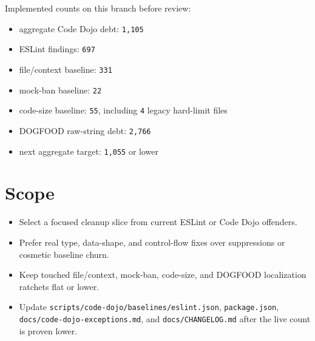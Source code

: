 Implemented counts on this branch before review:

\begin{itemize}
\tightlist
\item
  aggregate Code Dojo debt: \texttt{1\allowbreak{},\allowbreak{}1\allowbreak{}0\allowbreak{}5}
\item
  ESLint findings: \texttt{6\allowbreak{}9\allowbreak{}7}
\item
  file/context baseline: \texttt{3\allowbreak{}3\allowbreak{}1}
\item
  mock-ban baseline: \texttt{2\allowbreak{}2}
\item
  code-size baseline: \texttt{5\allowbreak{}5}, including \texttt{4} legacy hard-limit files
\item
  DOGFOOD raw-string debt: \texttt{2\allowbreak{},\allowbreak{}7\allowbreak{}6\allowbreak{}6}
\item
  next aggregate target: \texttt{1\allowbreak{},\allowbreak{}0\allowbreak{}5\allowbreak{}5} or lower
\end{itemize}

\section{Scope}\label{record-233-scope}

\begin{itemize}
\tightlist
\item
  Select a focused cleanup slice from current ESLint or Code Dojo offenders.
\item
  Prefer real type, data-shape, and control-flow fixes over suppressions or cosmetic baseline churn.
\item
  Keep touched file/context, mock-ban, code-size, and DOGFOOD localization ratchets flat or lower.
\item
  Update \texttt{s\allowbreak{}c\allowbreak{}r\allowbreak{}i\allowbreak{}p\allowbreak{}t\allowbreak{}s\allowbreak{}/\allowbreak{}c\allowbreak{}o\allowbreak{}d\allowbreak{}e\allowbreak{}-\allowbreak{}d\allowbreak{}o\allowbreak{}j\allowbreak{}o\allowbreak{}/\allowbreak{}b\allowbreak{}a\allowbreak{}s\allowbreak{}e\allowbreak{}l\allowbreak{}i\allowbreak{}n\allowbreak{}e\allowbreak{}s\allowbreak{}/\allowbreak{}e\allowbreak{}s\allowbreak{}l\allowbreak{}i\allowbreak{}n\allowbreak{}t\allowbreak{}.\allowbreak{}j\allowbreak{}s\allowbreak{}o\allowbreak{}n}, \texttt{p\allowbreak{}a\allowbreak{}c\allowbreak{}k\allowbreak{}a\allowbreak{}g\allowbreak{}e\allowbreak{}.\allowbreak{}j\allowbreak{}s\allowbreak{}o\allowbreak{}n}, \texttt{d\allowbreak{}o\allowbreak{}c\allowbreak{}s\allowbreak{}/\allowbreak{}c\allowbreak{}o\allowbreak{}d\allowbreak{}e\allowbreak{}-\allowbreak{}d\allowbreak{}o\allowbreak{}j\allowbreak{}o\allowbreak{}-\allowbreak{}e\allowbreak{}x\allowbreak{}c\allowbreak{}e\allowbreak{}p\allowbreak{}t\allowbreak{}i\allowbreak{}o\allowbreak{}n\allowbreak{}s\allowbreak{}.\allowbreak{}m\allowbreak{}d}, and \texttt{d\allowbreak{}o\allowbreak{}c\allowbreak{}s\allowbreak{}/\allowbreak{}C\allowbreak{}H\allowbreak{}A\allowbreak{}N\allowbreak{}G\allowbreak{}E\allowbreak{}L\allowbreak{}O\allowbreak{}G\allowbreak{}.\allowbreak{}m\allowbreak{}d} after the live count is proven lower.
\end{itemize}

